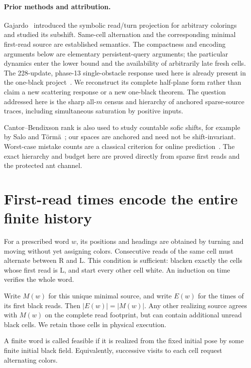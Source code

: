 \documentclass[11pt]{article}
\theoremstyle{definition}\newtheorem{definition}[theorem]{Definition}
\theoremstyle{remark}\newtheorem{remark}[theorem]{Remark}
\newcommand{\Rr}{\mathrm R}
\newcommand{\Ll}{\mathrm L}
\begin{document}
\paragraph{Prior methods and attribution.}
Gajardo~\cite{gajardo} introduced the symbolic read/turn projection for arbitrary
colorings and studied its subshift. Same-cell alternation and the corresponding
minimal first-read source are established semantics. The compactness and
encoding arguments below are elementary persistent-query arguments; the
particular dynamics enter the lower bound and the availability of arbitrarily
late fresh cells. The 228-update, phase-13 single-obstacle response used here
is already present in the one-black project~\cite{oneblack}. We reconstruct its
complete half-plane form rather than claim a new scattering response or a new
one-black theorem. The question addressed here is the sharp all-$m$ census and
hierarchy of anchored sparse-source traces, including simultaneous saturation
by positive inputs.

Cantor--Bendixson rank is also used to study countable sofic shifts, for
example by Salo and T\"orm\"a~\cite{salo}; our spaces are anchored and need
not be shift-invariant. Worst-case mistake counts are a classical criterion
for online prediction~\cite{littlestone}. The exact hierarchy and budget here
are proved directly from sparse first reads and the protected ant channel.

\section{First-read times encode the entire finite history}
For a prescribed word $w$, its positions and headings are obtained by turning
and moving without yet assigning colors. Consecutive reads of the same cell
must alternate between $\Rr$ and $\Ll$. This condition is sufficient: blacken
exactly the cells whose first read is $\Ll$, and start every other cell white.
An induction on time verifies the whole word.

Write $M(w)$ for this unique minimal source, and write $E(w)$ for the times of
its first black reads. Then $|E(w)|=|M(w)|$. Any other realizing source agrees
with $M(w)$ on the complete read footprint, but can contain additional unread
black cells. We retain those cells in physical execution.

A finite word is called feasible if it is realized from the fixed initial
pose by some finite initial black field. Equivalently, successive visits to
each cell request alternating colors.
\end{document}
